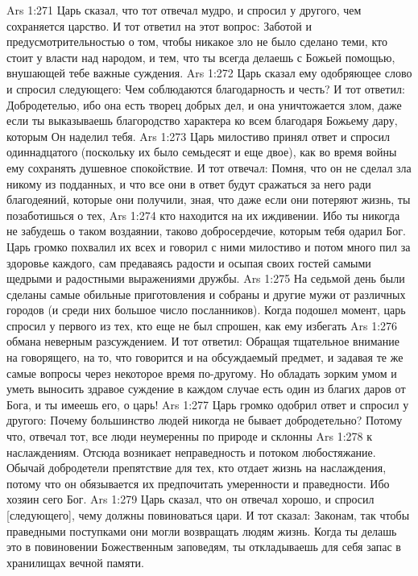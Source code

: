 \vs Ars 1:271
Царь сказал, что тот отвечал мудро, и спросил у другого, чем сохраняется царство. И тот ответил на этот вопрос: Заботой и предусмотрительностью о том, чтобы никакое зло не было сделано теми, кто стоит у власти над народом, и тем, что ты всегда делаешь с Божьей помощью, внушающей тебе важные суждения.
\vs Ars 1:272
Царь сказал ему одобряющее слово и спросил следующего: Чем соблюдаются благодарность и честь? И тот ответил: Добродетелью, ибо она есть творец добрых дел, и она уничтожается злом, даже если ты выказываешь благородство характера ко всем благодаря Божьему дару, которым Он наделил тебя.
\vs Ars 1:273
Царь милостиво принял ответ и спросил одиннадцатого (поскольку их было семьдесят и еще двое), как во время войны ему сохранять душевное спокойствие. И тот отвечал: Помня, что он не сделал зла никому из подданных, и что все они в ответ будут сражаться за него ради благодеяний, которые они получили, зная, что даже если они потеряют жизнь, ты позаботишься о тех,
\vs Ars 1:274
кто находится на их иждивении. Ибо ты никогда не забудешь о таком воздаянии, таково добросердечие, которым тебя одарил Бог.
Царь громко похвалил их всех и говорил с ними милостиво и потом много пил за здоровье каждого, сам предаваясь радости и осыпая своих гостей самыми щедрыми и радостными выражениями дружбы.
\vs Ars 1:275
На седьмой день были сделаны самые обильные приготовления и собраны и другие мужи от различных городов (и среди них большое число посланников). Когда подошел момент, царь спросил у первого из тех, кто еще не был спрошен, как ему избегать
\vs Ars 1:276
обмана неверным разсуждением. И тот ответил: Обращая тщательное внимание на говорящего, на то, что говорится и на обсуждаемый предмет, и задавая те же самые вопросы через некоторое время по-другому. Но обладать зорким умом и уметь выносить здравое суждение в каждом случае есть один из благих даров от Бога, и ты имеешь его, о царь!
\vs Ars 1:277
Царь громко одобрил ответ и спросил у другого: Почему большинство людей никогда не бывает добродетельно? Потому что, отвечал тот, все люди неумеренны по природе и склонны
\vs Ars 1:278
к наслаждениям. Отсюда возникает неправедность и потоком любостяжание. Обычай добродетели препятствие для тех, кто отдает жизнь на наслаждения, потому что он обязывается их предпочитать умеренности и праведности. Ибо хозяин сего Бог.
\vs Ars 1:279
Царь сказал, что он отвечал хорошо, и спросил [следующего], чему должны повиноваться цари. И тот сказал: Законам, так чтобы праведными поступками они могли возвращать людям жизнь. Когда ты делашь это в повиновении Божественным заповедям, ты откладываешь для себя запас в хранилищах вечной памяти.
